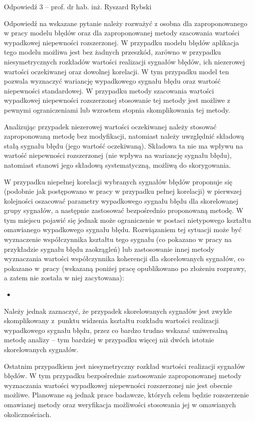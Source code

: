 \documentclass[12pt, polish, aspectratio = 169]{slides}
\begin{document}
\begin{frame}[allowframebreaks]{Odpowiedź 3 -- prof. dr hab. inż. Ryszard Rybski}\small
\begin{justify}
Odpowiedź na wskazane pytanie należy rozważyć z osobna dla zaproponowanego w pracy modelu błędów oraz dla zaproponowanej metody szacowania wartości wypadkowej niepewności rozszerzonej. W przypadku modelu błędów aplikacja tego modelu możliwa jest bez żadnych przeszkód, zarówno w przypadku niesymetrycznych rozkładów wartości realizacji sygnałów błędów, ich niezerowej wartości oczekiwanej oraz dowolnej korelacji. W tym przypadku model ten pozwala wyznaczyć wariancję wypadkowego sygnału błędu oraz wartość niepewności standardowej. W przypadku metody szacowania wartości wypadkowej niepewności rozszerzonej stosowanie tej metody jest możliwe z pewnymi ograniczeniami lub wzrostem stopnia skomplikowania tej metody.

Analizując przypadek niezerowej wartości oczekiwanej należy stosować zaproponowaną metodę bez modyfikacji, natomiast należy uwzględnić składową stałą sygnału błędu (jego wartość oczekiwaną). Składowa ta nie ma wpływu na wartość niepewności rozszerzonej (nie wpływa na wariancję sygnału błędu), natomiast stanowi jego składową systematyczną, możliwą do skorygowania.

W przypadku niepełnej korelacji wybranych sygnałów błędów proponuje się (podobnie jak postępowano w pracy w przypadku pełnej korelacji) w pierwszej kolejności oszacować parametry wypadkowego sygnału błędu dla skorelowanej grupy sygnałów, a następnie zastosować bezpośrednio proponowaną metodę. W tym miejscu pojawić się jednak może ograniczenie w postaci nietypowego kształtu omawianego wypadkowego sygnału błędu. Rozwiązaniem tej sytuacji może być wyznaczenie współczynnika kształtu tego sygnału (co pokazano w pracy na przykładzie sygnału błędu zaokrągleń) lub zastosowanie innej metody wyznaczania wartości współczynnika koherencji dla skorelowanych sygnałów, co pokazano w pracy (wskazaną poniżej pracę opublikowano po złożeniu rozprawy, a zatem nie została w niej zacytowana):

\begin{itemize}
\item {}
\end{itemize}

Należy jednak zaznaczyć, że przypadek skorelowanych sygnałów jest zwykle skomplikowany z punktu widzenia kształtu rozkładu wartości realizacji wypadkowego sygnału błędu, przez co bardzo trudno wskazać uniwersalną metodę analizy -- tym bardziej w przypadku więcej niż dwóch istotnie skorelowanych sygnałów.

Ostatnim przypadkiem jest niesymetryczny rozkład wartości realizacji sygnałów błędów. W tym przypadku bezpośrednie zastosowanie zaproponowanej metody wyznaczania wartości wypadkowej niepewności rozszerzonej nie jest obecnie możliwe. Planowane są jednak prace badawcze, których celem będzie rozszerzenie omawianej metody oraz weryfikacja możliwości stosowania jej w omawianych okolicznościach.
\end{justify}
\end{frame}
\end{document}
